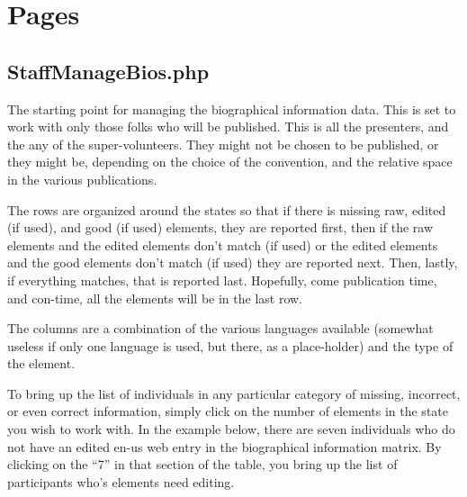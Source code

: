 \documentclass[tablesignature]{scrartcl}
\begin{document}
\section{Pages}
\label{sec-3}
\subsection{StaffManageBios.php}
\label{sec-3_1}

\label{StaffManageBios.php}

   The starting point for managing the biographical information data.
   This is set to work with only those folks who will be published.
   This is all the presenters, and the any of the super-volunteers.
   They might not be chosen to be published, or they might be,
   depending on the choice of the convention, and the relative space
   in the various publications.

   The rows are organized around the states so that if there is
   missing raw, edited (if used), and good (if used) elements, they
   are reported first, then if the raw elements and the edited
   elements don't match (if used) or the edited elements and the good
   elements don't match (if used) they are reported next.  Then,
   lastly, if everything matches, that is reported last.  Hopefully,
   come publication time, and con-time, all the elements will be in
   the last row.

   The columns are a combination of the various languages available
   (somewhat useless if only one language is used, but there, as a
   place-holder) and the type of the element.

   To bring up the list of individuals in any particular category of
   missing, incorrect, or even correct information, simply click on
   the number of elements in the state you wish to work with.  In the
   example below, there are seven individuals who do not have an
   edited en-us web entry in the biographical information matrix.  By
   clicking on the ``7'' in that section of the table, you bring up the
   list of participants who's elements need editing.
\end{document}
